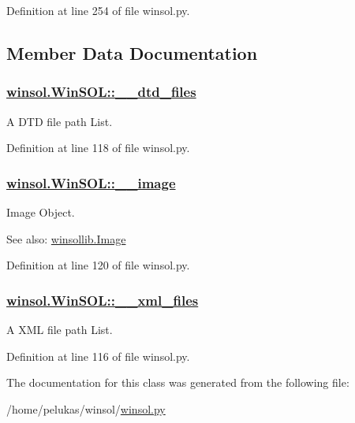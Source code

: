 Definition at line 254 of file winsol.py.

\subsection{Member Data Documentation}
\hypertarget{classwinsol_1_1WinSOL_8ed97ff01f8a93ddb672caebf196f2c8}{
\subsubsection[\_\-\_\-dtd\_\-files]{\setlength{\rightskip}{0pt plus 5cm}\hyperlink{classwinsol_1_1WinSOL_8ed97ff01f8a93ddb672caebf196f2c8}{winsol.Win\-SOL::\_\-\_\-dtd\_\-files}}}
\label{classwinsol_1_1WinSOL_8ed97ff01f8a93ddb672caebf196f2c8}


A DTD file path List. 



Definition at line 118 of file winsol.py.\hypertarget{classwinsol_1_1WinSOL_b15200b7b5af8a9ac4faddf753ed0584}{
\subsubsection[\_\-\_\-image]{\setlength{\rightskip}{0pt plus 5cm}\hyperlink{classwinsol_1_1WinSOL_b15200b7b5af8a9ac4faddf753ed0584}{winsol.Win\-SOL::\_\-\_\-image}}}
\label{classwinsol_1_1WinSOL_b15200b7b5af8a9ac4faddf753ed0584}


Image Object. 

\begin{Desc}
\item[See also:]\hyperlink{classwinsollib_1_1Image}{winsollib.Image} \end{Desc}


Definition at line 120 of file winsol.py.\hypertarget{classwinsol_1_1WinSOL_8ab97ce31e17380f58e5f7a6dca8245e}{
\subsubsection[\_\-\_\-xml\_\-files]{\setlength{\rightskip}{0pt plus 5cm}\hyperlink{classwinsol_1_1WinSOL_8ab97ce31e17380f58e5f7a6dca8245e}{winsol.Win\-SOL::\_\-\_\-xml\_\-files}}}
\label{classwinsol_1_1WinSOL_8ab97ce31e17380f58e5f7a6dca8245e}


A XML file path List. 



Definition at line 116 of file winsol.py.

The documentation for this class was generated from the following file:\begin{CompactItemize}
\item 
/home/pelukas/winsol/\hyperlink{winsol_8py}{winsol.py}\end{CompactItemize}
